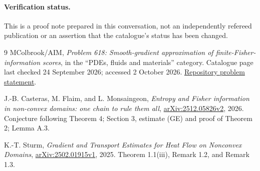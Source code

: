 \documentclass[11pt]{article}
\begin{document}
\paragraph{Verification status.}
This is a proof note prepared in this conversation, not an independently refereed publication or an assertion that the catalogue's status has been changed.

\begin{thebibliography}{9}
MColbrook/AIM, \emph{Problem 618: Smooth-gradient approximation of finite-Fisher-information scores}, in the ``PDEs, fluids and materials'' category. Catalogue page last checked 24 September 2026; accessed 2 October 2026.\newline
\href{https://github.com/MColbrook/AIM/blob/main/problems/618-fisher-score-gradient-closure.md}{Repository problem statement}.

J.-B. Casteras, M. Flaim, and L. Monsaingeon,
\emph{Entropy and Fisher information in non-convex domains: one chain to rule them all},
\href{https://arxiv.org/abs/2512.05826v2}{arXiv:2512.05826v2}, 2026.
Conjecture following Theorem 4; Section 3, estimate (GE) and proof of Theorem 2; Lemma A.3.

K.-T. Sturm,
\emph{Gradient and Transport Estimates for Heat Flow on Nonconvex Domains},
\href{https://arxiv.org/abs/2502.01915v1}{arXiv:2502.01915v1}, 2025.
Theorem 1.1(iii), Remark 1.2, and Remark 1.3.
\end{thebibliography}
\end{document}
